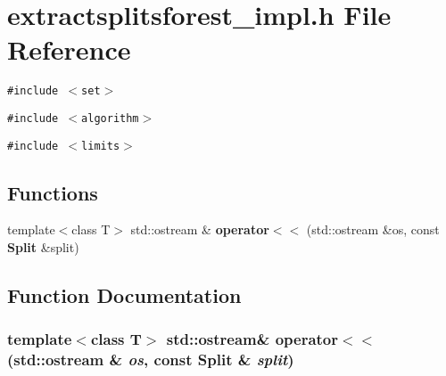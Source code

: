\section{extractsplitsforest\_\-impl.h File Reference}
\label{extractsplitsforest__impl_8h}
{\tt \#include $<$set$>$}\par
{\tt \#include $<$algorithm$>$}\par
{\tt \#include $<$limits$>$}\par
\subsection*{Functions}
\begin{CompactItemize}
\item 
template$<$class T$>$ std::ostream \& {\bf operator$<$$<$} (std::ostream \&os, const {\bf Split} \&split)
\end{CompactItemize}


\subsection{Function Documentation}
\subsubsection{\setlength{\rightskip}{0pt plus 5cm}template$<$class T$>$ std::ostream\& operator$<$$<$ (std::ostream \& {\em os}, const {\bf Split} \& {\em split})}\label{extractsplitsforest__impl_8h_a0}


